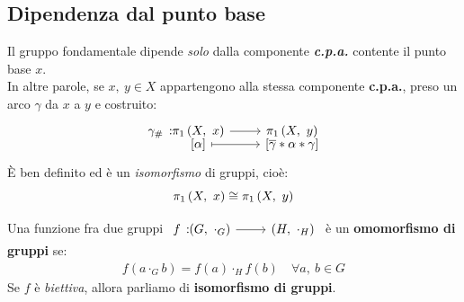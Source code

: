 \subsection{Dipendenza dal punto base}
\begin{theorema}\label{dipendenzaptobasegruf}
	Il gruppo fondamentale dipende \textit{solo} dalla componente \textit{\textbf{c.p.a.}} contente il punto base $x$.\\
	In altre parole, se $x,\ y\in X$ appartengono alla stessa componente \textbf{c.p.a.}, preso un arco $\gamma$ da $x$ a $y$ e costruito:
	\begin{equation}
		\funztot{\gamma_{\#}}{\gruf{X}{x}}{\gruf{X}{y}}{\left[\alpha\right]}{\left[\overline{\gamma}\ast\alpha\ast\gamma\right]}
	\end{equation}
	È ben definito ed è un \textit{isomorfismo} di gruppi, cioè:
	\begin{equation}
		\gruf{X}{x}\cong\gruf{X}{y}
	\end{equation}
\vspace{-6mm}
\end{theorema}
\begin{remember}
	Una funzione fra due gruppi $\funz{f}{\left(G,\ \cdot_G\right)}{\left(H,\ \cdot_H\right)}$ è un \textbf{omomorfismo di gruppi} se:
	\begin{gather*}
		f\left(a\cdot_G b\right)=f\left(a\right)\cdot_H f\left(b\right)\quad \forall a,\ b\in G
	\end{gather*}
	Se $f$ è \textit{biettiva}, allora parliamo di \textbf{isomorfismo di gruppi}.
\end{remember}
